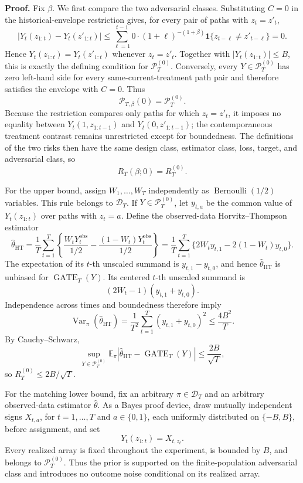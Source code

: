 \textbf{Proof.} Fix \(\beta\). We first compare the two adversarial classes. Substituting \(C=0\) in the historical-envelope restriction gives, for every pair of paths with \(z_t=z'_t\),
\[
\left|Y_t(z_{1:t})-Y_t(z'_{1:t})\right|
\le \sum_{\ell=1}^{t-1}0\cdot(1+\ell)^{-(1+\beta)}\mathbf 1\{z_{t-\ell}\ne z'_{t-\ell}\}=0.
\]
Hence \(Y_t(z_{1:t})=Y_t(z'_{1:t})\) whenever \(z_t=z'_t\). Together with \(\lvert Y_t(z_{1:t})\rvert\le B\), this is exactly the defining condition for \(\mathcal P_T^{(0)}\). Conversely, every \(Y\in\mathcal P_T^{(0)}\) has zero left-hand side for every same-current-treatment path pair and therefore satisfies the envelope with \(C=0\). Thus
\[
\mathcal P_{T,\beta}(0)=\mathcal P_T^{(0)}.
\]
Because the restriction compares only paths for which \(z_t=z'_t\), it imposes no equality between \(Y_t(1,z_{1:t-1})\) and \(Y_t(0,z'_{1:t-1})\); the contemporaneous treatment contrast remains unrestricted except for boundedness. The definitions of the two risks then have the same design class, estimator class, loss, target, and adversarial class, so
\[
R_T(\beta;0)=R_T^{(0)}.
\]

For the upper bound, assign \(W_1,\ldots,W_T\) independently as \(\operatorname{Bernoulli}(1/2)\) variables. This rule belongs to \(\mathcal D_T\). If \(Y\in\mathcal P_T^{(0)}\), let \(y_{t,a}\) be the common value of \(Y_t(z_{1:t})\) over paths with \(z_t=a\). Define the observed-data Horvitz--Thompson estimator
\[
\widehat\theta_{\mathrm{HT}}
=\frac1T\sum_{t=1}^T\left\{\frac{W_tY_t^{\mathrm{obs}}}{1/2}-\frac{(1-W_t)Y_t^{\mathrm{obs}}}{1/2}\right\}
=\frac1T\sum_{t=1}^T\{2W_ty_{t,1}-2(1-W_t)y_{t,0}\}.
\]
The expectation of its \(t\)-th unscaled summand is \(y_{t,1}-y_{t,0}\), and hence \(\widehat\theta_{\mathrm{HT}}\) is unbiased for \(\operatorname{GATE}_T(Y)\). Its centered \(t\)-th unscaled summand is
\[
(2W_t-1)(y_{t,1}+y_{t,0}).
\]
Independence across times and boundedness therefore imply
\[
\operatorname{Var}_\pi(\widehat\theta_{\mathrm{HT}})
=\frac1{T^2}\sum_{t=1}^T(y_{t,1}+y_{t,0})^2
\le \frac{4B^2}{T}.
\]
By Cauchy--Schwarz,
\[
\sup_{Y\in\mathcal P_T^{(0)}}\mathbb E_\pi\left|\widehat\theta_{\mathrm{HT}}-\operatorname{GATE}_T(Y)\right|
\le \frac{2B}{\sqrt T},
\]
so \(R_T^{(0)}\le 2B/\sqrt T\).

For the matching lower bound, fix an arbitrary \(\pi\in\mathcal D_T\) and an arbitrary observed-data estimator \(\widehat\theta\). As a Bayes proof device, draw mutually independent signs \(X_{t,a}\), for \(t=1,\ldots,T\) and \(a\in\{0,1\}\), each uniformly distributed on \(\{-B,B\}\), before assignment, and set
\[
Y_t(z_{1:t})=X_{t,z_t}.
\]
Every realized array is fixed throughout the experiment, is bounded by \(B\), and belongs to \(\mathcal P_T^{(0)}\). Thus the prior is supported on the finite-population adversarial class and introduces no outcome noise conditional on its realized array.

